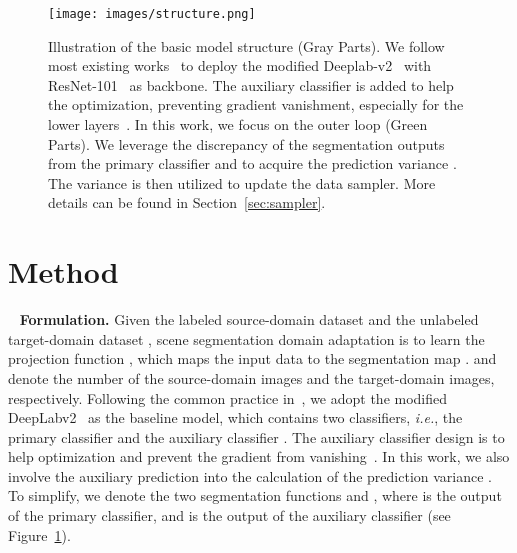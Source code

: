 \documentclass[journal]{IEEEtran}
\def\ie{\emph{i.e.}}
\begin{document}
\begin{figure}[t]
\begin{center}
\texttt{[image: images/structure.png]}
\end{center}
\vspace{-.2in}
\caption{Illustration of the basic model structure (Gray Parts). We follow most existing works~\cite{tsai2018learning,luo2019significance,luo2019taking,tsai2019domain,zheng2019unsupervised,zheng2020unsupervised} to deploy the modified Deeplab-v2~\cite{chen2017deeplab} with ResNet-101~\cite{he2016deep} as backbone. The auxiliary classifier is added to help the optimization, preventing gradient vanishment, especially for the lower layers~\cite{szegedy2015going, zhao2017pyramid}. In this work, we focus on the outer loop (\textcolor{citecolor}{Green} Parts). We leverage the discrepancy of the segmentation outputs from the primary classifier  and  to acquire the prediction variance . The variance is then utilized to update the data sampler. More details can be found in Section~\ref{sec:sampler}.}
\label{fig:structure}
\end{figure}

\section{Method}~\label{sec:method}
\noindent\textbf{Formulation.} Given the labeled source-domain dataset  and the unlabeled target-domain  dataset , scene segmentation domain adaptation is to learn the projection function , which maps the input data  to the segmentation map .  and  denote the number of the source-domain images and the target-domain images, respectively. 
Following the common practice in~\cite{tsai2018learning,luo2019significance,zheng2019unsupervised}, we adopt the modified DeepLabv2~\cite{chen2017deeplab} as the baseline model, which contains two classifiers, \ie, the primary classifier  and the auxiliary classifier . The auxiliary classifier design is to help optimization and prevent the gradient from vanishing~\cite{szegedy2015going, zhao2017pyramid}. In this work, we also involve the auxiliary prediction into the calculation of the prediction variance . To simplify, we denote the two segmentation functions  and , where  is the output of the primary classifier, and  is the output of the auxiliary classifier (see Figure~\ref{fig:structure}).
\end{document}
